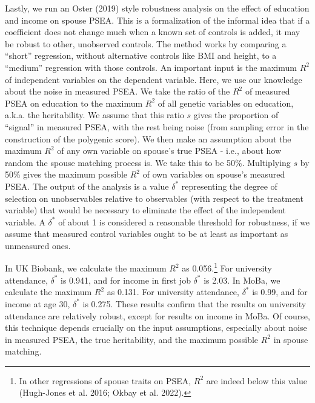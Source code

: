 \documentclass[
  12pt,
]{article}
\theoremstyle{definition}
\theoremstyle{definition}
\theoremstyle{definition}
\theoremstyle{definition}
\theoremstyle{remark}
\begin{document}
Lastly, we run an Oster (2019) style robustness analysis on the
effect of education and income on spouse PSEA. This is a formalization of the
informal idea that if a coefficient does not change much when a known set of
controls is added, it may be robust to other, unobserved controls. The method
works by comparing a ``short'' regression, without alternative controls like BMI
and height, to a ``medium'' regression with those controls. An important input is
the maximum \(R^2\) of independent variables on the dependent variable. Here,
we use our knowledge about the noise in measured PSEA. We take the ratio of
the \(R^2\) of measured PSEA on education to the maximum \(R^2\) of all genetic
variables on education, a.k.a. the heritability. We assume that this ratio
\(s\) gives the proportion of ``signal'' in measured PSEA, with the rest being
noise (from sampling error in the construction of the polygenic score). We then
make an assumption about the maximum \(R^2\) of any own variable on
spouse's true PSEA - i.e., about how random the spouse matching
process is. We take this to be 50\%. Multiplying \(s\) by 50\%
gives the maximum possible \(R^2\) of own variables on spouse's measured PSEA.
The output of the analysis is a value \(\delta^*\) representing the degree of
selection on unobservables relative to observables (with respect to the treatment
variable) that would be necessary to eliminate the effect of the independent
variable. A \(\delta^*\) of about 1 is considered a reasonable threshold for
robustness, if we assume that measured control variables ought to be at least as
important as unmeasured ones.

In UK Biobank, we calculate the maximum \(R^2\) as 0.056.\footnote{In other regressions of spouse traits on
  PSEA, \(R^2\) are indeed below this value (Hugh-Jones et al. 2016; Okbay et al. 2022).} For university
attendance, \(\delta^*\) is 0.941, and for income in first job
\(\delta^*\) is 2.03. In MoBa, we calculate the maximum \(R^2\) as
0.131. For university attendance, \(\delta^*\) is 0.99,
and for income at age 30, \(\delta^*\) is 0.275. These results
confirm that the results on university attendance are relatively robust, except
for results on income in MoBa. Of course, this technique depends crucially
on the input assumptions, especially about noise in measured PSEA, the true
heritability, and the maximum possible \(R^2\) in spouse matching.
\end{document}
